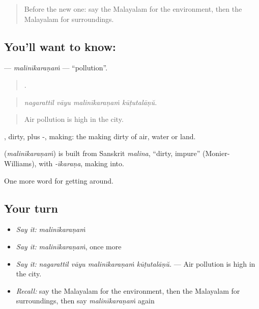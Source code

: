 \label{lesson:ML-C503-malinikaranam}



\begin{quote}
Before the new one: say the Malayalam for the environment, then the Malayalam for surroundings.
\end{quote}

\subsection*{You'll want to know: }
\textbf{} — \emph{malinīkaraṇaṁ} — \textquotedblleft{}pollution\textquotedblright{}.

\begin{quote}
   .
\end{quote}

\begin{quote}
\emph{nagarattil vāyu malinīkaraṇaṁ kūṭutalāṇŭ.}
\end{quote}

\begin{quote}
Air pollution is high in the city.
\end{quote}

, dirty, plus -, making: the making dirty of air, water or land.

\begin{cousinweb}
\textbf{} (\emph{malinīkaraṇaṁ}) is built from Sanskrit \emph{malina}, \textquotedblleft{}dirty, impure\textquotedblright{} (Monier-Williams), with \emph{-īkaraṇa}, making into.
\end{cousinweb}

\begin{grammarlens}[title={What you've built}]
One more word for getting around.
\end{grammarlens}

\subsection*{Your turn}
\begin{itemize}
\raggedright
  \item \emph{Say it:} \emph{malinīkaraṇaṁ}
  \item \emph{Say it:} \emph{malinīkaraṇaṁ}, once more
  \item \emph{Say it:} \emph{nagarattil vāyu malinīkaraṇaṁ kūṭutalāṇŭ.} — Air pollution is high in the city.
  \item \emph{Recall:} say the Malayalam for the environment, then the Malayalam for surroundings, then say \emph{malinīkaraṇaṁ} again
\end{itemize}

